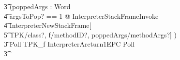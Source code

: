 \begin{figure}[tp!]
\begin{circusaction}
    \t3 (\circvar poppedArgs : \seq Word \circspot \\
    \t4 \lschexpract \exists argsToPop? == 1 @ InterpreterStackFrameInvoke \rschexpract \circseq \\
    \t4 \lschexpract InterpreterNewStackFrame[\\
    \t5 TPK/class?, f/methodID?, poppedArgs/methodArgs?] \rschexpract) \circseq \\
    \t3 Poll \circseq TPK\_f \circseq \lschexpract InterpreterAreturn1EPC \rschexpract \circseq Poll \circseq \\
    \t3 {} \cdots {} \\

\end{circusaction}
\end{figure}
